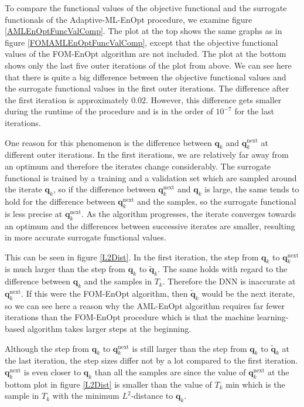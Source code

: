 To compare the functional values of the objective functional and the surrogate functionals of the Adaptive-ML-EnOpt procedure, we examine figure \ref{AMLEnOptFuncValComp}. The plot at the top shows the same graphs as in figure \ref{FOMAMLEnOptFuncValComp}, except that the objective functional values of the FOM-EnOpt algorithm are not included. The plot at the bottom shows only the last five outer iterations of the plot from above. We can see here that there is quite a big difference between the objective functional values and the surrogate functional values in the first outer iterations. The difference after the first iteration is approximately $0.02$. However, this difference gets smaller during the runtime of the procedure and is in the order of $10^{-7}$ for the last iterations.

One reason for this phenomenon is the difference between $\mathbf{q}_k$ and $\mathbf{q}^\mathrm{next}_k$ at different outer iterations. In the first iterations, we are relatively far away from an optimum and therefore the iterates change considerably. The surrogate functional is trained by a training and a validation set which are sampled around the iterate $\mathbf{q}_k$, so  if the difference between $\mathbf{q}^\mathrm{next}_k$ and $\mathbf{q}_k$ is large, the same tends to hold for the difference between $\mathbf{q}^\mathrm{next}_k$ and the samples, so the surrogate functional is less precise at $\mathbf{q}^\mathrm{next}_k$. As the algorithm progresses, the iterate converges towards an optimum and the differences between successive iterates are smaller, resulting in more accurate surrogate functional values.

This can be seen in figure \ref{L2Dist}. In the first iteration, the step from $\mathbf{q}_k$ to $\mathbf{q}^\mathrm{next}_k$ is much larger than the step from $\mathbf{q}_k$ to $\tilde{\mathbf{q}}_k$. The same holds with regard to the difference between $\mathbf{q}_k$ and the samples in $T_k$. Therefore the DNN is inaccurate at $\mathbf{q}^\mathrm{next}_k$. If this were the FOM-EnOpt algorithm, then $\tilde{\mathbf{q}}_k$ would be the next iterate, so we can see here a reason why the AML-EnOpt algorithm requires far fewer iterations than the FOM-EnOpt procedure which is that the machine learning-based algorithm takes larger steps at the beginning.

Although the step from $\mathbf{q}_k$ to $\mathbf{q}^\mathrm{next}_k$ is still larger than the step from $\mathbf{q}_k$ to $\tilde{\mathbf{q}}_k$ at the last iteration, the step sizes differ not by a lot compared to the first iteration. $\mathbf{q}^\mathrm{next}_k$ is even closer to $\mathbf{q}_k$ than all the samples are since the value of $\mathbf{q}^\mathrm{next}_k$ at the bottom plot in figure \ref{L2Dist} is smaller than the value of $T_k$ min which is the sample in $T_k$ with the minimum $L^2$-distance to $\mathbf{q}_k$.\\

